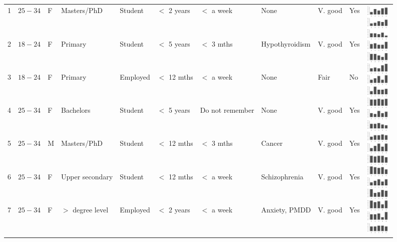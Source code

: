 \begin{landscape}
\begin{table}[t]
\begin{tabular}{p{0.75cm} p{1.25cm} p{1cm} p{2cm} p{2cm} p{2cm} p{3cm} p{2.5cm} p{2.5cm} p{1.5cm} p{1.5cm}}
    1	&   $25-34$	& F    &   Masters/PhD	            &   Student     &  $<$ 2 years     & $<$ a week	    & None	                 & V. good	    & Yes    &  \multirow{20}{*}{\includegraphics[clip, trim=0cm 0cm 0cm 0cm, width=1.20cm]{figures/big_5.pdf}} \\ 
    2	&   $18-24$	& F    &   Primary	                &   Student     &  $<$ 5 years     & $<$ 3 mths	    & Hypothyroidism	     & V. good	    & Yes    &                                      \\ 
    3	&   $18-24$	& F    &   Primary	                &   Employed    &  $<$ 12 mths     & $<$ a week	    & None	                 & Fair	        & No     &                                      \\ 
    4	&   $25-34$	& F    &   Bachelors	            &   Student     &  $<$ 5 years     & Do not remember	        & None	                 & V. good	    & Yes    &                                      \\ 
    5	&   $25-34$	& M    &   Masters/PhD	            &   Student	    &  $<$ 12 mths     & $<$ 3 mths	    & Cancer	             & V. good	    & Yes    &                                      \\ 
    6	&   $25-34$	& F    &   Upper secondary	        &   Student	    &  $<$ 12 mths     & $<$ a week	    & Schizophrenia	         & V. good	    & Yes    &                                      \\ 
    7	&   $25-34$	& F    &   $>$ degree level	        &   Employed	&  $<$ 2 years     & $<$ a week	    & Anxiety, \acs{PMDD}	 & V. good	    & Yes    &                                      \\ 

\end{tabular}
\end{table}
\end{landscape}
